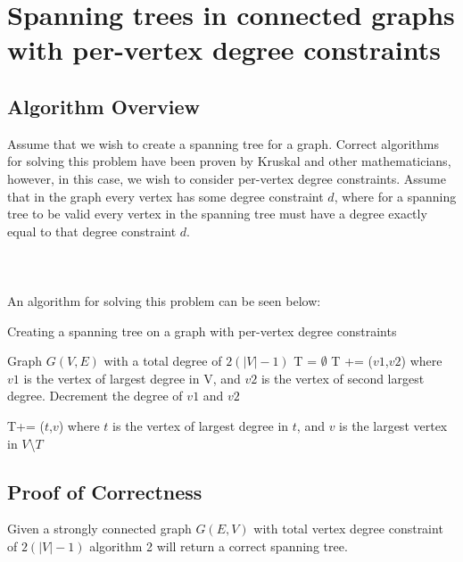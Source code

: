 \documentclass{article}
\begin{document}
	\section{Spanning trees in connected graphs with per-vertex degree constraints}
	\subsection{Algorithm Overview}
	Assume that we wish to create a spanning tree for a graph. Correct algorithms for solving this problem have been proven by Kruskal and other
	mathematicians, however, in this case, we wish to consider per-vertex degree constraints. Assume that in the graph every vertex has some degree constraint $d$,
	where for a spanning tree to be valid every vertex in the spanning tree must have a degree exactly equal to that degree constraint $d$. 
	\\\\\\\\
	
	An algorithm for solving this problem can be seen below:
	\\

		\begin{algorithm}[H]
		\caption{Creating a spanning tree on a graph with per-vertex degree constraints}
		\begin{algorithmic}[1]
			\State Graph $G(V,E)$ with a total degree of $2(|V|-1)$
			\State T = $\emptyset$
			\State T += ($v1$,$v2$) where $v1$ is the vertex of largest degree in V, and $v2$ is the vertex of second largest degree. Decrement the degree of $v1$ and $v2$
			\State \parbox[t]{\dimexpr\linewidth-\algorithmicindent}{T+= ($t$,$v$) where $t$ is the vertex of largest degree in $t$, and $v$ is the largest vertex in $V$\textbackslash$T$\strut}
			\EndWhile
		\end{algorithmic}
	\newpage
	\end{algorithm}
	\subsection{Proof of Correctness}
	\begin{theorem}
		Given a strongly connected graph $G(E,V)$ with total vertex degree constraint of $2(|V|-1)$ algorithm 2 will return a correct spanning tree.
	\end{theorem}
\end{document}
